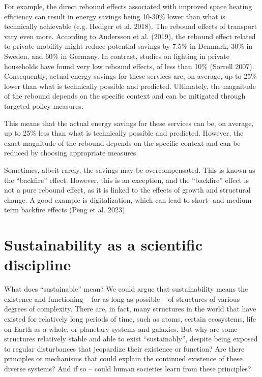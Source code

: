\documentclass[
  a4paper,
  DIV=11,
  numbers=noendperiod,
  oneside,
  openany]{scrreprt}
\begin{document}
For example, the direct rebound effects associated with improved space
heating efficiency can result in energy savings being 10-30\% lower than
what is technically achievable (e.g. Hediger et al. 2018). The rebound
effects of transport vary even more. According to Andersson et al.
(2019), the rebound effect related to private mobility might reduce
potential savings by 7.5\% in Denmark, 30\% in Sweden, and 60\% in
Germany. In contrast, studies on lighting in private households have
found very low rebound effects, of less than 10\% (Sorrell 2007).
Consequently, actual energy savings for these services are, on average,
up to 25\% lower than what is technically possible and predicted.
Ultimately, the magnitude of the rebound depends on the specific context
and can be mitigated through targeted policy measures.

This means that the actual energy savings for these services can be, on
average, up to 25\% less than what is technically possible and
predicted. However, the exact magnitude of the rebound depends on the
specific context and can be reduced by choosing appropriate measures.

Sometimes, albeit rarely, the savings may be overcompensated. This is
known as the ``backfire'' effect. However, this is an exception, and the
``backfire'' effect is not a pure rebound effect, as it is linked to the
effects of growth and structural change. A good example is
digitalization, which can lead to short- and medium-term backfire
effects (Peng et al. 2023).

\section{Sustainability as a scientific
discipline}\label{sustainability-as-a-scientific-discipline}

What does ``sustainable'' mean? We could argue that sustainability means
the existence and functioning -- for as long as possible -- of
structures of various degrees of complexity. There are, in fact, many
structures in the world that have existed for relatively long periods of
time, such as atoms, certain ecosystems, life on Earth as a whole, or
planetary systems and galaxies. But why are some structures relatively
stable and able to exist ``sustainably'', despite being exposed to
regular disturbances that jeopardize their existence or function? Are
there principles or mechanisms that could explain the continued
existence of these diverse systems? And if so -- could human societies
learn from these principles?
\end{document}
